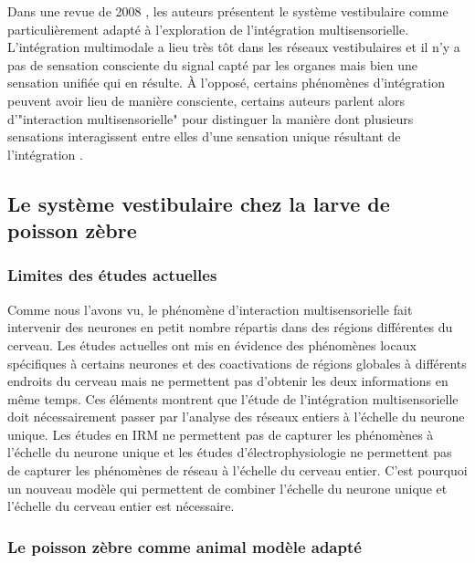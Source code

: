 Dans une revue de 2008 \cite{angelaki_vestibular_2008}, les auteurs présentent le système vestibulaire comme particulièrement adapté à l'exploration de l'intégration multisensorielle. L'intégration multimodale a lieu très tôt dans les réseaux vestibulaires et il n'y a pas de sensation consciente du signal capté par les organes mais bien une sensation unifiée qui en résulte.
À l'opposé, certains phénomènes d'intégration peuvent avoir lieu de manière consciente, certains auteurs parlent alors d'"interaction multisensorielle" pour distinguer la manière dont plusieurs sensations interagissent entre elles d'une sensation unique résultant de l'intégration \cite{driver_multisensory_2008}. 


\subsection{Le système vestibulaire chez la larve de poisson zèbre}

\subsubsection{Limites des études actuelles}

Comme nous l'avons vu, le phénomène d'interaction multisensorielle fait intervenir des neurones en petit nombre répartis dans des régions différentes du cerveau. Les études actuelles ont mis en évidence des phénomènes locaux spécifiques à certains neurones et des coactivations de régions globales à différents endroits du cerveau mais ne permettent pas d'obtenir les deux informations en même temps. 
Ces éléments montrent que l'étude de l'intégration multisensorielle doit nécessairement passer par l'analyse des réseaux entiers à l'échelle du neurone unique. Les études en IRM ne permettent pas de capturer les phénomènes à l'échelle du neurone unique et les études d'électrophysiologie ne permettent pas de capturer les phénomènes de réseau à l'échelle du cerveau entier. C'est pourquoi un nouveau modèle qui permettent de combiner l'échelle du neurone unique et l'échelle du cerveau entier est nécessaire.

\subsubsection{Le poisson zèbre comme animal modèle adapté}

